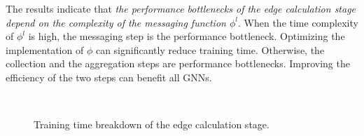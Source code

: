 The results indicate that \emph{the performance bottlenecks of the edge calculation stage depend on the complexity of the messaging function $\phi^l$}.
%
When the time complexity of $\phi^l$ is high, the messaging step is the performance bottleneck.
%
Optimizing the implementation of $\phi$ can significantly reduce training time.
%
Otherwise, the collection and the aggregation steps are performance bottlenecks.
%
Improving the efficiency of the two steps can benefit all GNNs.

\begin{figure}[H]
    \centering
    \\
    \caption{Training time breakdown of the edge calculation stage.}
    \label{fig:exp_edge_calc_decomposition}
\end{figure}


